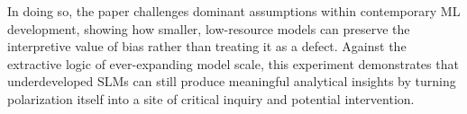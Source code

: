 \documentclass[letterpaper]{article} %
\begin{document}
In doing so, the paper challenges dominant assumptions within contemporary ML development, showing how smaller, low-resource models can preserve the interpretive value of bias rather than treating it as a defect. Against the extractive logic of ever-expanding model scale, this experiment demonstrates that underdeveloped SLMs can still produce meaningful analytical insights by turning polarization itself into a site of critical inquiry and potential intervention.




% 
\end{document}
